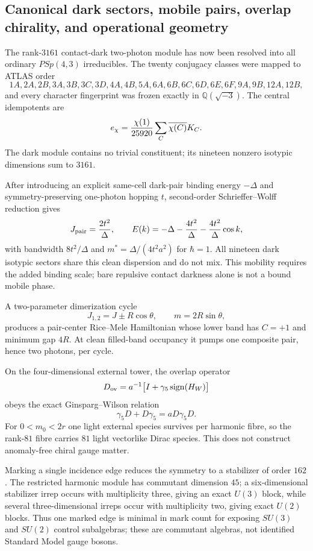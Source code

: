 \subsection{Canonical dark sectors, mobile pairs, overlap chirality, and operational geometry}
\label{sec:bt4081-4088-deep-physics}

The rank-$3161$ contact-dark two-photon module has now been resolved into
all ordinary $PSp(4,3)$ irreducibles.  The twenty conjugacy classes were
mapped to ATLAS order
\[
1A,2A,2B,3A,3B,3C,3D,4A,4B,5A,6A,6B,6C,6D,6E,6F,9A,9B,12A,12B,
\]
and every character fingerprint was frozen exactly in
$\mathbb Q(\sqrt{-3})$.  The central idempotents are
\[
e_\chi={\chi(1)\over25920}\sum_C\overline{\chi(C)}K_C.
\]
The dark module contains no trivial constituent; its nineteen nonzero
isotypic dimensions sum to $3161$.

After introducing an explicit same-cell dark-pair binding energy $-\Delta$
and symmetry-preserving one-photon hopping $t$, second-order
Schrieffer--Wolff reduction gives
\[
J_{\rm pair}={2t^2\over\Delta},\qquad
E(k)=-\Delta-{4t^2\over\Delta}-{4t^2\over\Delta}\cos k,
\]
with bandwidth $8t^2/\Delta$ and
$m^*=\Delta/(4t^2a^2)$ for $\hbar=1$.  All nineteen dark isotypic sectors
share this clean dispersion and do not mix.  This mobility requires the
added binding scale; bare repulsive contact darkness alone is not a bound
mobile phase.

A two-parameter dimerization cycle
\[
J_{1,2}=J\pm R\cos\theta,\qquad m=2R\sin\theta,
\]
produces a pair-center Rice--Mele Hamiltonian whose lower band has
$C=+1$ and minimum gap $4R$.  At clean filled-band occupancy it pumps one
composite pair, hence two photons, per cycle.

On the four-dimensional external tower, the overlap operator
\[
D_{\rm ov}=a^{-1}\bigl[I+\gamma_5\operatorname{sign}(H_W)\bigr]
\]
obeys the exact Ginsparg--Wilson relation
\[
\gamma_5D+D\gamma_5=aD\gamma_5D.
\]
For $0<m_0<2r$ one light external species survives per harmonic fibre,
so the rank-$81$ fibre carries $81$ light vectorlike Dirac species.
This does not construct anomaly-free chiral gauge matter.

Marking a single incidence edge reduces the symmetry to a stabilizer of
order $162$.  The restricted harmonic module has commutant dimension $45$;
a six-dimensional stabilizer irrep occurs with multiplicity three, giving
an exact $U(3)$ block, while several three-dimensional irreps occur with
multiplicity two, giving exact $U(2)$ blocks.  Thus one marked edge is
minimal in mark count for exposing $SU(3)$ and $SU(2)$ control
subalgebras; these are commutant algebras, not identified Standard Model
gauge bosons.

